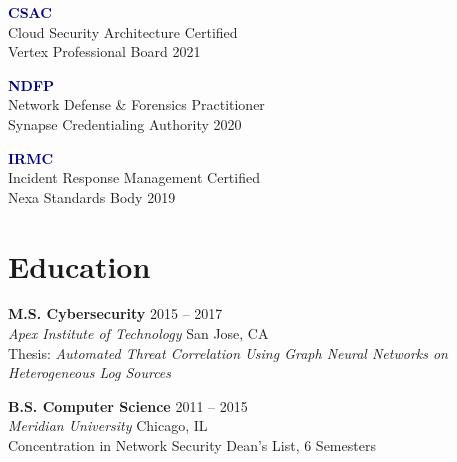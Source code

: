 \documentclass[11pt,a4paper]{article}
\newcommand{\cvdate}[1]{\textcolor{mediumgray}{\small #1}}
\begin{document}
\noindent
\begin{minipage}{0.325\textwidth}
\begin{tcolorbox}[certbox]
\textbf{\textcolor{navy}{CSAC}}\\[2pt]
{\small Cloud Security Architecture Certified}\\[1pt]
{\footnotesize\color{mediumgray} Vertex Professional Board \textbar{} 2021}
\end{tcolorbox}
\end{minipage}\hfill
\begin{minipage}{0.325\textwidth}
\begin{tcolorbox}[certbox]
\textbf{\textcolor{navy}{NDFP}}\\[2pt]
{\small Network Defense \& Forensics Practitioner}\\[1pt]
{\footnotesize\color{mediumgray} Synapse Credentialing Authority \textbar{} 2020}
\end{tcolorbox}
\end{minipage}\hfill
\begin{minipage}{0.325\textwidth}
\begin{tcolorbox}[certbox]
\textbf{\textcolor{navy}{IRMC}}\\[2pt]
{\small Incident Response Management Certified}\\[1pt]
{\footnotesize\color{mediumgray} Nexa Standards Body \textbar{} 2019}
\end{tcolorbox}
\end{minipage}

\section{Education}

\vspace{4pt}

\noindent
\textbf{M.S. Cybersecurity} \hfill \cvdate{2015 -- 2017}\\
\textit{Apex Institute of Technology} \textbar{} San Jose, CA\\
\small Thesis: \textit{Automated Threat Correlation Using Graph Neural Networks on Heterogeneous Log Sources}

\vspace{6pt}

\noindent
\textbf{B.S. Computer Science} \hfill \cvdate{2011 -- 2015}\\
\textit{Meridian University} \textbar{} Chicago, IL\\
\small Concentration in Network Security \textbar{} Dean's List, 6 Semesters
\end{document}
